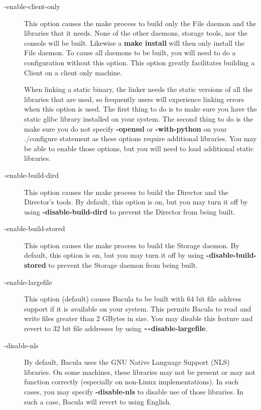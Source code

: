 \begin{description}
\item [ {-}{\-}enable-client-only]
   This option causes the make process to build only the File daemon and
   the libraries that it needs.  None of the other daemons, storage tools,
   nor the console will be built.  Likewise a {\bf make install} will then
   only install the File daemon.  To cause all daemons to be built, you
   will need to do a configuration without this option.  This option
   greatly facilitates building a Client on a client only machine.

   When linking a static binary, the linker needs the static versions
   of all the libraries that are used, so frequently users will 
   experience linking errors when this option is used. The first 
   thing to do is to make sure you have the static glibc library 
   installed on your system. The second thing to do is the make sure
   you do not specify {\bf {-}{\-}openssl} or {\bf {-}{\-}with-python}
   on your ./configure statement as these options require additional
   libraries. You may be able to enable those options, but you will
   need to load additional static libraries.

\item [ {-}{\-}enable-build-dird]
   This option causes the make process to build the Director and the
   Director's tools. By default, this option is on, but you may turn
   it off by using {\bf {-}{\-}disable-build-dird} to prevent the
   Director from being built.

\item [ {-}{\-}enable-build-stored]
   This option causes the make process to build the Storage daemon.
   By default, this option is on, but you may turn
   it off by using {\bf {-}{\-}disable-build-stored} to prevent the
   Storage daemon from being built.


\item [ {-}{\-}enable-largefile]
   This option (default) causes  Bacula to be built with 64 bit file address
   support if it  is available on your system. This permits Bacula to read and 
   write files greater than 2 GBytes in size. You may disable this  feature and
   revert to 32 bit file addresses by using  {\bf \verb:--:disable-largefile}.  

\item [ {-}{\-}disable-nls]
   By default, Bacula uses the GNU Native Language Support (NLS) libraries. On
   some machines, these libraries may not be present or may not function 
   correctly (especially on non-Linux implementations). In such cases, you
   may specify {\bf {-}{\-}disable-nls} to disable use of those libraries.
   In such a case, Bacula will revert to using English.


\end{description}

